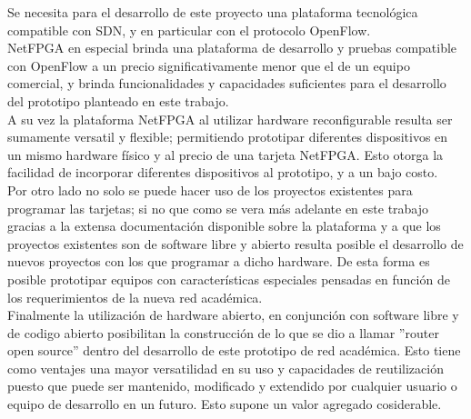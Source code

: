 Se necesita para el desarrollo de este proyecto una plataforma tecnol\'ogica compatible con SDN, y en particular con el protocolo OpenFlow.\\
NetFPGA en especial brinda una plataforma de desarrollo y pruebas compatible con OpenFlow a un precio significativamente menor que el de un equipo comercial, y brinda funcionalidades y capacidades suficientes para el desarrollo del prototipo planteado en este trabajo.\\

A su vez la plataforma NetFPGA al utilizar hardware reconfigurable resulta ser sumamente versatil y flexible; permitiendo prototipar diferentes dispositivos en un mismo hardware f\'isico y al precio de una tarjeta NetFPGA. Esto otorga la facilidad de incorporar diferentes dispositivos al prototipo, y a un bajo costo.\\

Por otro lado no solo se puede hacer uso de los proyectos existentes para programar las tarjetas; si no que como se vera m\'as adelante en este trabajo gracias a la extensa documentaci\'on disponible sobre la plataforma y a que los proyectos existentes son de software libre y abierto resulta posible el desarrollo de nuevos proyectos con los que programar a dicho hardware. De esta forma es posible prototipar equipos con caracter\'isticas especiales pensadas en funci\'on de los requerimientos de la nueva red acad\'emica.\\

Finalmente la utilizaci\'on de hardware abierto, en conjunci\'on con software libre y de codigo abierto posibilitan la construcci\'on de lo que se dio a llamar ''router open source'' dentro del desarrollo de este prototipo de red acad\'emica. Esto tiene como ventajes una mayor versatilidad en su uso y capacidades de reutilizaci\'on puesto que puede ser mantenido, modificado y extendido por cualquier usuario o equipo de desarrollo en un futuro. Esto supone un valor agregado cosiderable. 